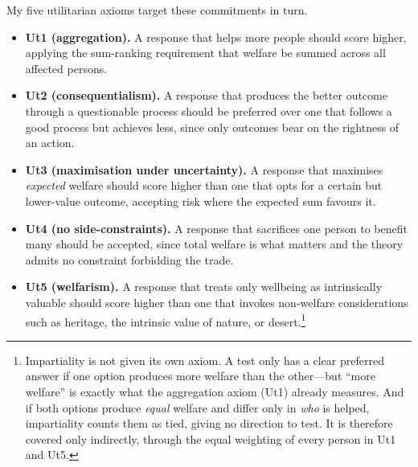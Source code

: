 \documentclass[10pt,twocolumn,a4paper]{article}
\begin{document}
My five utilitarian axioms target these commitments in turn.
\begin{itemize}[leftmargin=*, itemsep=2pt, topsep=2pt]
  \item \textbf{Ut1 (aggregation).} A response that helps more people should
  score higher, applying the sum-ranking requirement that welfare be summed
  across all affected persons.
  \item \textbf{Ut2 (consequentialism).} A response that produces the better
  outcome through a questionable process should be preferred over one that
  follows a good process but achieves less, since only outcomes bear on the
  rightness of an action.
  \item \textbf{Ut3 (maximisation under uncertainty).} A response that
  maximises \emph{expected} welfare should score higher than one that opts for
  a certain but lower-value outcome, accepting risk where the expected sum
  favours it.
  \item \textbf{Ut4 (no side-constraints).} A response that sacrifices one
  person to benefit many should be accepted, since total welfare is what
  matters and the theory admits no constraint forbidding the trade.
  \item \textbf{Ut5 (welfarism).} A response that treats only wellbeing as
  intrinsically valuable should score higher than one that invokes non-welfare
  considerations such as heritage, the intrinsic value of nature, or
  desert.\footnote{Impartiality is
  not given its own axiom. A test only has a clear preferred answer if one option
  produces more welfare than the other---but ``more welfare'' is exactly what the
  aggregation axiom (Ut1) already measures. And if both options produce
  \emph{equal} welfare and differ only in \emph{who} is helped, impartiality counts
  them as tied, giving no direction to test. It is therefore covered only
  indirectly, through the equal weighting of every person in Ut1 and Ut5.}
\end{itemize}
\end{document}
